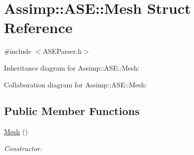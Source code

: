 \hypertarget{struct_assimp_1_1_a_s_e_1_1_mesh}{\section{Assimp\+:\+:A\+S\+E\+:\+:Mesh Struct Reference}
\label{struct_assimp_1_1_a_s_e_1_1_mesh}
}


{\ttfamily \#include $<$A\+S\+E\+Parser.\+h$>$}



Inheritance diagram for Assimp\+:\+:A\+S\+E\+:\+:Mesh\+:


Collaboration diagram for Assimp\+:\+:A\+S\+E\+:\+:Mesh\+:
\subsection*{Public Member Functions}
\begin{DoxyCompactItemize}
\item 
\hypertarget{struct_assimp_1_1_a_s_e_1_1_mesh_ab1b677cace18a7c79022136087dd4a25}{\hyperlink{struct_assimp_1_1_a_s_e_1_1_mesh_ab1b677cace18a7c79022136087dd4a25}{Mesh} ()}\label{struct_assimp_1_1_a_s_e_1_1_mesh_ab1b677cace18a7c79022136087dd4a25}

\begin{DoxyCompactList}\small\item\em Constructor. \end{DoxyCompactList}\end{DoxyCompactItemize}
